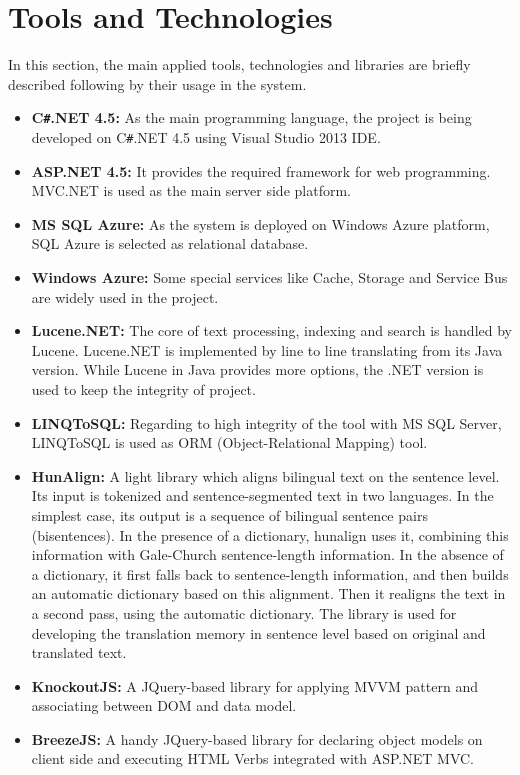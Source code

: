 \section{Tools and Technologies}
\label{sec:tools}
In this section, the main applied tools, technologies and libraries are briefly described following by their usage in the system.

\begin{itemize}
	\item \textbf{C\texttt{\#}.NET 4.5:} As the main programming language, the project is being developed on C\texttt{\#}.NET 4.5 using Visual Studio 2013 IDE.
	\item \textbf{ASP.NET 4.5:} It provides the required framework for web programming. MVC.NET is used as the main server side platform.
	\item \textbf{MS SQL Azure:} As the system is deployed on Windows Azure platform, SQL Azure is selected as relational database.
	\item \textbf{Windows Azure:} Some special services like Cache, Storage and Service Bus are widely used in the project.
	\item \textbf{Lucene.NET:} The core of text processing, indexing and search is handled by Lucene. Lucene.NET is implemented by line to line translating from its Java version. While Lucene in Java provides more options, the .NET version is used to keep the integrity of project.
	\item \textbf{LINQToSQL:} Regarding to high integrity of the tool with MS SQL Server, LINQToSQL is used as ORM (Object-Relational Mapping) tool.
	\item \textbf{HunAlign\cite{hunalign}:} A light library which aligns bilingual text on the sentence level. Its input is tokenized and sentence-segmented text in two languages. In the simplest case, its output is a sequence of bilingual sentence pairs (bisentences). In the presence of a dictionary, hunalign uses it, combining this information  with Gale-Church sentence-length information. In the absence of a dictionary, it first falls back to sentence-length information, and then builds an automatic dictionary based on this alignment. Then it realigns the text in a second pass, using the automatic dictionary. The library is used for developing the translation memory in sentence level based on original and translated text.
	\item \textbf{KnockoutJS:} A JQuery-based library for applying MVVM pattern and associating between DOM and data model.
	\item \textbf{BreezeJS:} A handy JQuery-based library for declaring object models on client side and executing HTML Verbs integrated with ASP.NET MVC.

\end{itemize}
